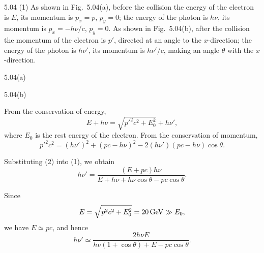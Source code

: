 \begin{solution}{5.04}
(1) As shown in Fig.~5.04(a), before the collision the energy of the electron is $E$, its
momentum is $p_x = p$, $p_y = 0$; the energy of the photon is $h\nu$, its momentum is
$p_x = -h\nu/c$, $p_y = 0$. As shown in Fig.~5.04(b), after the collision the momentum of the
electron is $p'$, directed at an angle to the $x$-direction; the energy of the photon is
$h\nu'$, its momentum is $h\nu'/c$, making an angle $\theta$ with the $x$-direction.

\begin{figbox}{5.04(a)}
\end{figbox}

\begin{figbox}{5.04(b)}
\end{figbox}

From the conservation of energy,
\begin{equation}
E + h\nu = \sqrt{p'^2c^2 + E_0^2} + h\nu', \tag{1}
\end{equation}
where $E_0$ is the rest energy of the electron. From the conservation of momentum,
\begin{equation}
p'^2c^2 = (h\nu')^2 + (pc - h\nu)^2 - 2(h\nu')(pc - h\nu)\cos\theta. \tag{2}
\end{equation}

Substituting (2) into (1), we obtain
\begin{equation*}
h\nu' = \frac{(E + pc)h\nu}{E + h\nu + h\nu\cos\theta - pc\cos\theta}.
\end{equation*}

Since
\begin{equation*}
E = \sqrt{p^2c^2 + E_0^2} = 20\,\mathrm{GeV} \gg E_0,
\end{equation*}
we have $E \simeq pc$, and hence
\begin{equation*}
h\nu' \simeq \frac{2h\nu E}{h\nu(1 + \cos\theta) + E - pc\cos\theta}.
\end{equation*}


\end{solution}
